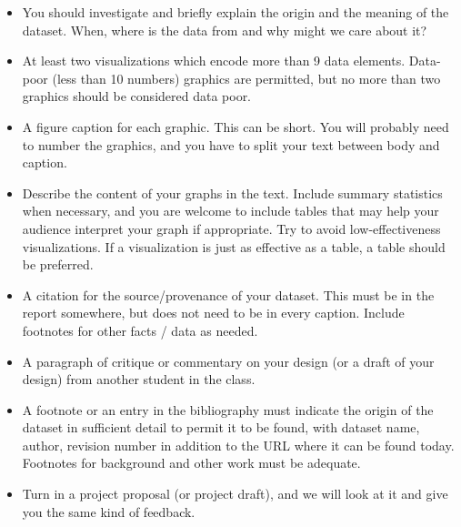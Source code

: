 \documentclass[]{book}
\theoremstyle{definition}
\begin{document}
\begin{itemize}

\item  You should investigate and briefly explain the origin and the meaning of the dataset.  When, where is the data from and why might we care about it?  

\item 
At least two visualizations which encode more than 9 data elements. Data-poor (less than 10 numbers) graphics are permitted, but no more than two graphics should be considered data poor.

\item 
A figure caption for each graphic. This can be short. You will probably need to number the graphics, and you have to split your text between body and caption.
\item 
Describe the content of your graphs in the text.  Include summary statistics when necessary, and you are welcome to include tables that may help your audience interpret your graph if appropriate. Try to avoid low-effectiveness visualizations. If a visualization is just as effective as a table, a table should be preferred.
\item 
 A citation for the source/provenance of your dataset. This must be in the report somewhere, but does not need to be in every caption. Include footnotes for other facts / data as needed.
\item 
 A paragraph of critique or commentary on your design (or a draft of your design) from another student in the class.


\item A footnote or an entry in the bibliography must indicate the origin of the dataset in sufficient detail to permit it to be found, with dataset name, author, revision number in addition to the URL where it can be found today.  Footnotes for background and other work must be adequate. 

\item Turn in a project proposal (or project draft), and we will look at it and give you the same kind of feedback.  




\end{itemize}
\end{document}
